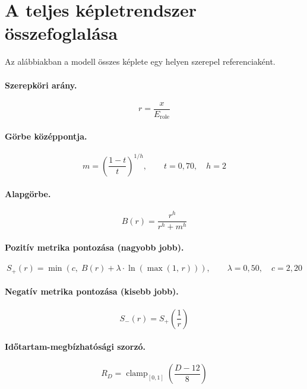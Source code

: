 ﻿\documentclass[a4paper,12pt]{report}
\begin{document}
\section{A teljes képletrendszer összefoglalása}

Az alábbiakban a modell összes képlete egy helyen szerepel referenciaként.

\paragraph{Szerepköri arány.}
\begin{equation}
r = \frac{x}{E_{\text{role}}}
\end{equation}

\paragraph{Görbe középpontja.}
\begin{equation}
m = \left(\frac{1-t}{t}\right)^{1/h}, \qquad t = 0{,}70,\quad h = 2
\end{equation}

\paragraph{Alapgörbe.}
\begin{equation}
B(r) = \frac{r^h}{r^h + m^h}
\end{equation}

\paragraph{Pozitív metrika pontozása (nagyobb jobb).}
\begin{equation}
S_+(r) = \min\!\left(c,\; B(r) + \lambda \cdot \ln\!\left(\max(1,\, r)\right)\right), \qquad \lambda = 0{,}50,\quad c = 2{,}20
\end{equation}

\paragraph{Negatív metrika pontozása (kisebb jobb).}
\begin{equation}
S_-(r) = S_+\!\left(\frac{1}{r}\right)
\end{equation}

\paragraph{Időtartam-megbízhatósági szorzó.}
\begin{equation}
R_D = \operatorname{clamp}_{[0,1]}\!\left(\frac{D - 12}{8}\right)
\end{equation}
\end{document}
